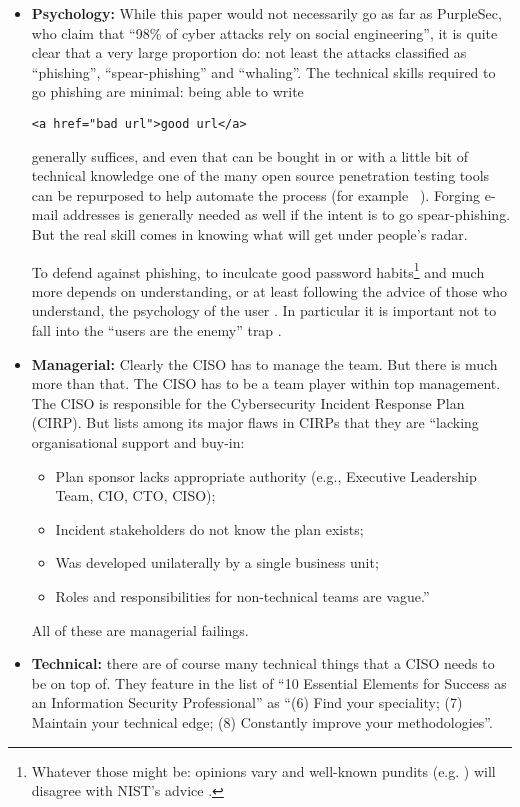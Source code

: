 \documentclass[conference]{IEEEtran}
\begin{document}
\begin{itemize}
\item{\bf Psychology:} While this paper would not necessarily go as far as PurpleSec, who claim \cite{PurpleSec2020a} that ``98\% of cyber attacks rely on social engineering'', it is quite clear that a very large proportion do: not least the attacks classified as ``phishing'', ``spear-phishing'' and ``whaling''. The technical skills required to go phishing are minimal: being able to write
\begin{verbatim}
<a href="bad url">good url</a>
\end{verbatim}
generally suffices, and even that can be bought in or with a little bit of technical knowledge one of the many open source penetration testing tools can be repurposed to help automate the process (for example ~\cite{goPhish,king-Phisher}).  Forging e-mail addresses is generally needed as well if the intent is to go spear-phishing. But the real skill comes in knowing what will get under people's radar.
\par
To defend against phishing, to inculcate good password habits\footnote{Whatever those might be: opinions vary and well-known pundits (e.g. \cite{Grimes2019b}) will disagree with NIST's advice \cite{NIST2019e}.} and much more depends on understanding, or at least following the advice of those who understand, the psychology of the user \cite{InglesantSasse2010a}. In particular it is important not to fall into the ``users are the enemy'' trap \cite{AdamsSasse1999}.
\item{\bf Managerial:} Clearly the CISO has to manage the team. But there is much more than that. The CISO has to be a team player within top management. The CISO is responsible for the Cybersecurity Incident Response Plan (CIRP). But \cite{Secureworks2019a} lists among its major flaws in CIRPs that they are ``lacking organisational support and buy-in:
\begin{itemize}
\item Plan sponsor lacks appropriate authority
(e.g., Executive Leadership Team, CIO, CTO, CISO);
\item Incident stakeholders do not know the plan exists;
\item Was developed unilaterally by a single business unit;
\item Roles and responsibilities for non-technical teams are vague.''
\end{itemize}
All of these are managerial failings.
\item{\bf Technical:} there are of course many technical things that a CISO needs to be on top of.  They feature in the list \cite{Beaver2017a} of ``10 Essential Elements for Success as an Information Security Professional'' as ``(6) Find your speciality; (7) Maintain your technical edge; (8) Constantly improve your methodologies''.


\end{itemize}
\end{document}
